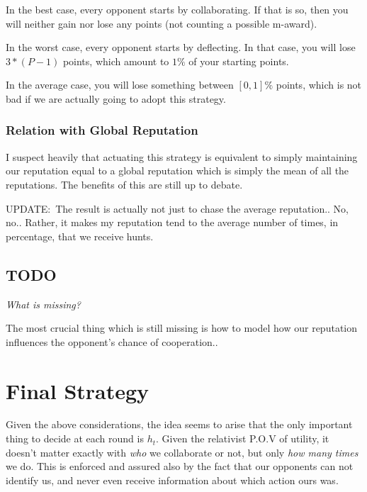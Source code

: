 \documentclass[10pt,fleqn]{article}
\begin{document}
In the best case, every opponent starts by collaborating. If that is so, then
you will neither gain nor lose any points (not counting a possible m-award).

In the worst case, every opponent starts by deflecting. In that case, you will
lose $3*(P-1)$ points, which amount to $1\%$ of your starting points.

In the average case, you will lose something between $[0, 1]\%$ points, which is
not bad if we are actually going to adopt this strategy.

\subsubsection{Relation with Global Reputation}
I suspect heavily that actuating this strategy is equivalent to simply
maintaining our reputation equal to a global reputation which is simply the mean
of all the reputations. The benefits of this are still up to debate.

UPDATE:\ The result is actually not just to chase the average reputation.. No,
no..  Rather, it makes my reputation tend to the average number of times, in
percentage, that we receive hunts.

\subsection{TODO}
\emph{What is missing?}

The most crucial thing which is still missing is how to model how our reputation
influences the opponent's chance of cooperation..

\section{Final Strategy}

Given the above considerations, the idea seems to arise that the only important
thing to decide at each round is $h_t$. Given the relativist P.O.V of utility, it
doesn't matter exactly with \emph{who} we collaborate or not, but only \emph{how
many times} we do. This is enforced and assured also by the fact that our
opponents can not identify us, and never even receive information about which
action ours was.
\end{document}
